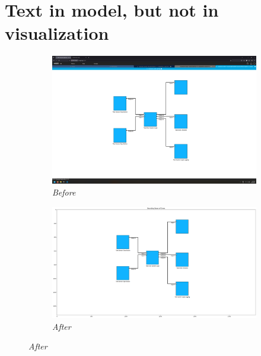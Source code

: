 \documentclass{article}
\begin{document}
\newpage

\section{Text in model, but not in visualization}
\begin{figure}[H]
    \centering
    \begin{subfigure}[t]{0.9\textwidth}
        \centering
        \includegraphics[width=\textwidth]{testcases/text_in_model_not_in_visualization/160709-183438_input_image.png}
        \caption*{\textit{Before}}
    \end{subfigure}
    \newline
    \begin{subfigure}[t]{0.9\textwidth}
        \centering
        \includegraphics[width=\textwidth]{testcases/text_in_model_not_in_visualization/160729-501686_element_bbox_errors_labeled_colored.png}
        \caption*{\textit{After}}
    \end{subfigure}
    \label{fig:text_in_model_not_viz}
\end{figure}
\end{document}
